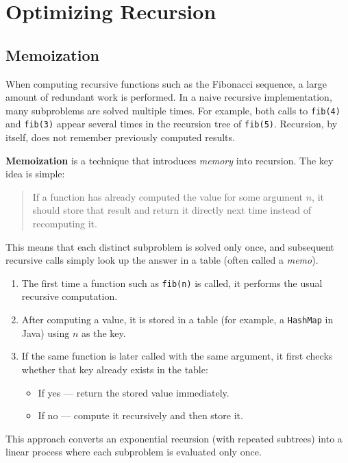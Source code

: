 \documentclass{article}
\begin{document}
\section{Optimizing Recursion}
\subsection{Memoization}

When computing recursive functions such as the Fibonacci sequence, a large amount of redundant work is performed.
In a naive recursive implementation, many subproblems are solved multiple times.
For example, both calls to \texttt{fib(4)} and \texttt{fib(3)} appear several times in the recursion tree of \texttt{fib(5)}.
Recursion, by itself, does not remember previously computed results.

\textbf{Memoization} is a technique that introduces \emph{memory} into recursion.
The key idea is simple:

\begin{quote}
	If a function has already computed the value for some argument $n$,
	it should store that result and return it directly next time instead of recomputing it.
\end{quote}

This means that each distinct subproblem is solved only once,
and subsequent recursive calls simply look up the answer in a table (often called a \emph{memo}).

\begin{enumerate}
	\item The first time a function such as \texttt{fib(n)} is called, it performs the usual recursive computation.
	\item After computing a value, it is stored in a table (for example, a \texttt{HashMap} in Java) using $n$ as the key.
	\item If the same function is later called with the same argument, it first checks whether that key already exists in the table:
	\begin{itemize}
		\item If yes --- return the stored value immediately.
		\item If no --- compute it recursively and then store it.
	\end{itemize}
\end{enumerate}

This approach converts an exponential recursion (with repeated subtrees) into a linear process where each subproblem is evaluated only once.
\end{document}
